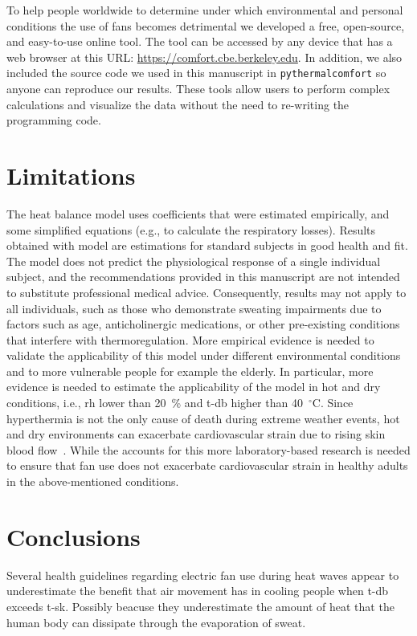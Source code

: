 To help people worldwide to determine under which environmental and personal conditions the use of fans becomes detrimental we developed a free, open-source, and easy-to-use online tool.
The tool can be accessed by any device that has a web browser at this URL: \url{https://comfort.cbe.berkeley.edu}.
In addition, we also included the source code we used in this manuscript in \verb|pythermalcomfort| so anyone can reproduce our results.
These tools allow users to perform complex calculations and visualize the data without the need to re-writing the programming code.

\section*{Limitations}
The  heat balance model uses coefficients that were estimated empirically, and some simplified equations (e.g., to calculate the respiratory losses).
Results obtained with  model are estimations for standard subjects in good health and fit.
The model does not predict the physiological response of a single individual subject, and the recommendations provided in this manuscript are not intended to substitute professional medical advice.
Consequently, results may not apply to all individuals, such as those who demonstrate sweating impairments due to factors such as age, anticholinergic medications, or other pre-existing conditions that interfere with thermoregulation.
More empirical evidence is needed to validate the applicability of this model under different environmental conditions and to more vulnerable people for example the elderly.
In particular, more evidence is needed to estimate the applicability of the  model in hot and dry conditions, i.e., \ac{rh} lower than 20~\% and \ac{t-db} higher than 40~$^{\circ}$C.
Since hyperthermia is not the only cause of death during extreme weather events, hot and dry environments can exacerbate cardiovascular strain due to rising skin blood flow~\cite{Morris2021a}.
While the  accounts for this more laboratory-based research is needed to ensure that fan use does not exacerbate cardiovascular strain in healthy adults in the above-mentioned conditions.

\section{Conclusions}\label{sec:conclusions}
Several health guidelines regarding electric fan use during heat waves appear to underestimate the benefit that air movement has in cooling people when \acf{t-db} exceeds \acf{t-sk}.
Possibly beacuse they underestimate the amount of heat that the human body can dissipate through the evaporation of sweat.

